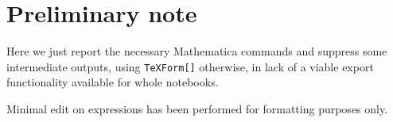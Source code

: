 \section*{Preliminary note}

Here we just report the necessary Mathematica commands
and suppress some intermediate outputs,
using \verb#TeXForm[]# otherwise,
in lack of a viable export functionality
available for whole notebooks.

Minimal edit on expressions has been performed for formatting purposes only.